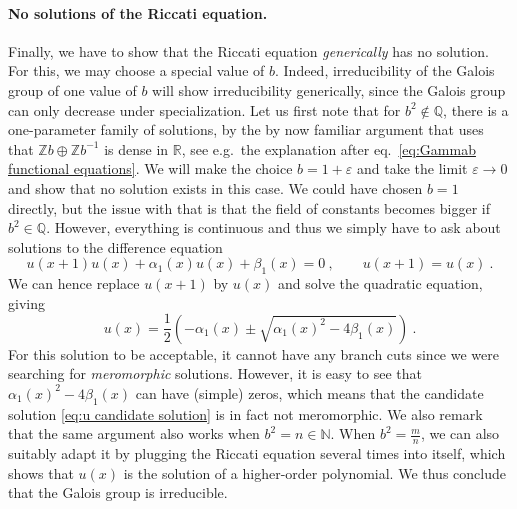 \documentclass[12pt,a4paper]{article}
\newcommand{\be}{\begin{equation}}
\newcommand{\ee}{\end{equation}}
\newcommand\ZZ{\mathbb{Z}}
\newcommand\QQ{\mathbb{Q}}
\newcommand\NN{\mathbb{N}}
\begin{document}
\paragraph{No solutions of the Riccati equation.} Finally, we have to show that the Riccati equation \emph{generically} has no solution. For this, we may choose a special value of $b$. Indeed, irreducibility of the Galois group of one value of $b$ will show irreducibility generically, since the Galois group can only decrease under specialization.
Let us first note that for $b^2 \not\in \QQ$, there is a one-parameter family of solutions, by the by now familiar argument that uses that $\ZZ b\oplus \ZZ b^{-1}$ is  dense in $\mathbb{R}$, see e.g.\ the explanation after eq.~\eqref{eq:Gammab functional equations}.
We will make the choice $b=1+\varepsilon$ and take the limit $\varepsilon \to 0$ and show that no solution exists in this case. We could have chosen $b=1$ directly, but the issue with that is that the field of constants becomes bigger if $b^2 \in \QQ$. However, everything is continuous and thus we simply have to ask about solutions to the difference equation
\be 
u(x+1)u(x)+\alpha_1(x)u(x)+\beta_1(x)=0\ , \qquad u(x+1)=u(x)\ . 
\ee
We can hence replace $u(x+1)$ by $u(x)$ and solve the quadratic equation, giving
\be 
u(x)=\frac{1}{2}\left(-\alpha_1(x)\pm\sqrt{\alpha_1(x)^2-4\beta_1(x)}\right)\ . \label{eq:u candidate solution}
\ee
For this solution to be acceptable, it cannot have any branch cuts since we were searching for \emph{meromorphic} solutions. However, it is easy to see that $\alpha_1(x)^2-4\beta_1(x)$ can have (simple) zeros, which means that the candidate solution \eqref{eq:u candidate solution} is in fact not meromorphic. We also remark that the same argument also works when $b^2=n \in \NN$. When $b^2=\frac{m}{n}$, we can also suitably adapt it by plugging the Riccati equation several times into itself, which shows that $u(x)$ is the solution of a higher-order polynomial.
We thus conclude that the Galois group is irreducible.
\end{document}
